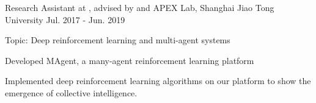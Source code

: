 \begin{cventries}
\cventry
    {Research Assistant at , advised by  and } %
    {APEX Lab, Shanghai Jiao Tong University} %
    {Jul. 2017 - Jun. 2019} %
    {} %
    {
      \begin{cvitems} %
      \item{Topic: Deep reinforcement learning and multi-agent systems}
      \item {Developed MAgent, a many-agent reinforcement learning platform}
      \item {Implemented deep reinforcement learning algorithms on our platform to show the emergence of collective intelligence.}
      \end{cvitems}
    }
\end{cventries}
